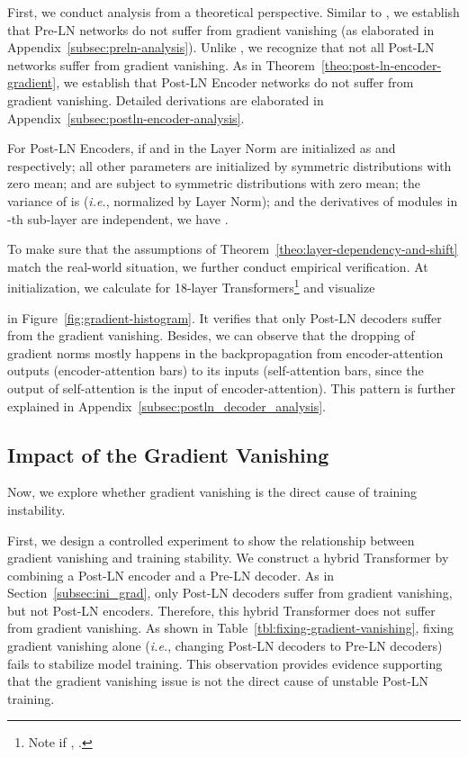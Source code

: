 \documentclass[11pt,a4paper]{article}
\newcommand{\ie}{\textit{i.e.}}
\begin{document}
First, we conduct analysis from a theoretical perspective. 
Similar to \citet{Xiong2019OnLN}, we establish that Pre-LN networks do not suffer from gradient vanishing (as elaborated in Appendix~\ref{subsec:preln-analysis}). 
Unlike \citet{Xiong2019OnLN}, we recognize that not all Post-LN networks suffer from gradient vanishing. 
As in Theorem~\ref{theo:post-ln-encoder-gradient}, we establish that Post-LN Encoder networks do not suffer from gradient vanishing. 
Detailed derivations are elaborated in Appendix~\ref{subsec:postln-encoder-analysis}. 

\begin{theorem}
For Post-LN Encoders, if  and  in the Layer Norm are initialized as  and  respectively; all other parameters are initialized by symmetric distributions with zero mean;  and  are subject to symmetric distributions with zero mean; the variance of  is  (\ie, normalized by Layer Norm);  and the derivatives of modules in -th sub-layer are independent, we have .
\label{theo:post-ln-encoder-gradient}
\end{theorem}

To make sure that the assumptions of Theorem~\ref{theo:layer-dependency-and-shift} match the real-world situation, we further conduct empirical verification. 
At initialization, we calculate  for 18-layer Transformers\footnote{Note if , .} and visualize
 
in Figure~\ref{fig:gradient-histogram}.
It verifies that only Post-LN decoders suffer from the gradient vanishing. 
Besides, we can observe that the dropping of gradient norms mostly happens in the backpropagation from encoder-attention outputs (encoder-attention bars) to its inputs (self-attention bars, since the output of self-attention is the input of encoder-attention). 
This pattern is further explained in Appendix~\ref{subsec:postln_decoder_analysis}. 

\subsection{Impact of the Gradient Vanishing}

Now, we explore whether gradient vanishing is the direct cause of training instability.





First, we design a controlled experiment to show the relationship between gradient vanishing and training stability. 
We construct a hybrid Transformer by combining a Post-LN encoder and a Pre-LN decoder. 
As in Section~\ref{subsec:ini_grad}, only Post-LN decoders suffer from gradient vanishing, but not Post-LN encoders. 
Therefore, this hybrid Transformer does not suffer from gradient vanishing. 
As shown in Table~\ref{tbl:fixing-gradient-vanishing}, fixing gradient vanishing alone (\ie, changing Post-LN decoders to Pre-LN decoders) fails to stabilize model training. 
This observation provides evidence supporting that the gradient vanishing issue is not the direct cause of unstable Post-LN training. 
\end{document}
